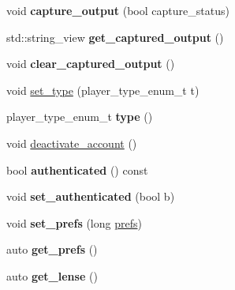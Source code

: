 \begin{DoxyCompactItemize}
\item 
\mbox{\label{classmods_1_1player_a9b9ce853251b47cecf9a355010af8191}} 
void {\bfseries capture\+\_\+output} (bool capture\+\_\+status)
\item 
\mbox{\label{classmods_1_1player_a71cf4e3a0c9a61cd769b42e889648901}} 
std\+::string\+\_\+view {\bfseries get\+\_\+captured\+\_\+output} ()
\item 
\mbox{\label{classmods_1_1player_a4105554f0492c385628f95873db9f43d}} 
void {\bfseries clear\+\_\+captured\+\_\+output} ()
\item 
void \hyperlink{classmods_1_1player_a75e7ab6e28ec637e3d1a8f905162bf3e}{set\+\_\+type} (player\+\_\+type\+\_\+enum\+\_\+t t)
\item 
\mbox{\label{classmods_1_1player_ac3e0e49947a0467423dfa6dcd49ee221}} 
player\+\_\+type\+\_\+enum\+\_\+t {\bfseries type} ()
\item 
void \hyperlink{classmods_1_1player_abbbcc9a9d532b3fbfcd16faeb72e8a35}{deactivate\+\_\+account} ()
\item 
\mbox{\label{classmods_1_1player_a64c35848966d08ed05f855d1c62379db}} 
bool {\bfseries authenticated} () const
\item 
\mbox{\label{classmods_1_1player_adb9b217ecc48632204193e36f576a7d2}} 
void {\bfseries set\+\_\+authenticated} (bool b)
\item 
\mbox{\label{classmods_1_1player_ad0354db5732137a41995c4356b533102}} 
void {\bfseries set\+\_\+prefs} (long \hyperlink{classmods_1_1prefs}{prefs})
\item 
\mbox{\label{classmods_1_1player_a0ee2902819f112c4723abe3df1cd58ae}} 
auto {\bfseries get\+\_\+prefs} ()
\item 
\mbox{\label{classmods_1_1player_a760f4dfe08f944e64ba64faf3a1b41bd}} 
auto {\bfseries get\+\_\+lense} ()
\item 
\mbox{\label{classmods_1_1player_af920cb9294852247b743416b11962bdc}} 

\end{DoxyCompactItemize}
